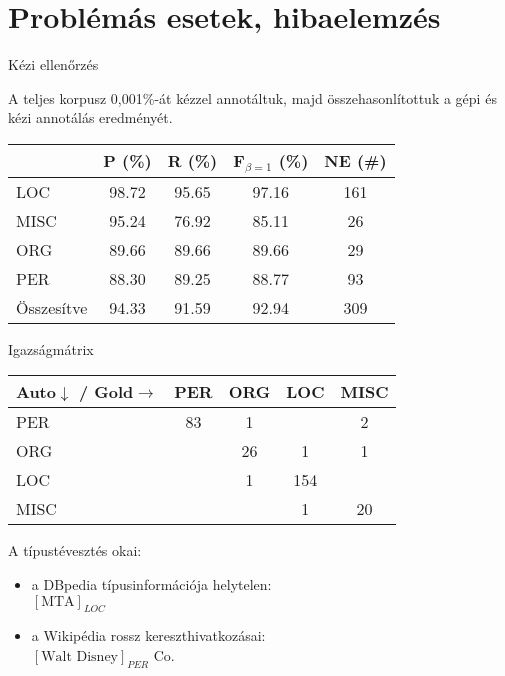 \documentclass[utf8x,t]{beamer}
\begin{document}
\section{Problémás esetek, hibaelemzés}

\begin{frame}{Kézi ellenőrzés}

\bigskip

A teljes korpusz 0,001\%-át kézzel annotáltuk, majd összehasonlítottuk a gépi és kézi annotálás eredményét.

\bigskip

\begin{center}
\begin{tabular}{lcccc}
\toprule
& P (\%) &  R (\%) & F$_{\beta=1}$ (\%) & NE (\#) \\
\midrule
LOC     &   98.72 &  95.65 &  97.16 & 161 \\
MISC    &   95.24 &  76.92 &  85.11 & 26 \\
ORG     &   89.66 &  89.66 &  89.66 & 29 \\
PER     &   88.30 &  89.25 &  88.77 & 93 \\
\midrule
Összesítve &   94.33 &  91.59 &  92.94 & 309 \\
\bottomrule
\end{tabular} 
\end{center}

\end{frame}

\begin{frame}{Igazságmátrix}

\bigskip

\begin{center}
\begin{tabular}{l@{\hspace{0.5em}}|@{\hspace{0.5em}}cccc}
\toprule
Auto$\downarrow$ / Gold$\rightarrow$ & PER & ORG & LOC & MISC \\
\midrule
PER & 83 & 1 & & 2 \\
ORG &  & 26 & 1 & 1 \\
LOC &  & 1 & 154 & \\
MISC &  &  & 1 & 20 \\
\bottomrule
\end{tabular}
\end{center}

\bigskip

A típustévesztés okai:

\begin{itemize}
\item a DBpedia típusinformációja helytelen: \\ $[\mbox{MTA}]_{LOC}$
\item a Wikipédia rossz kereszthivatkozásai: \\ $[\mbox{Walt Disney}]_{PER}$ Co.
\end{itemize}

\end{frame}
\end{document}
